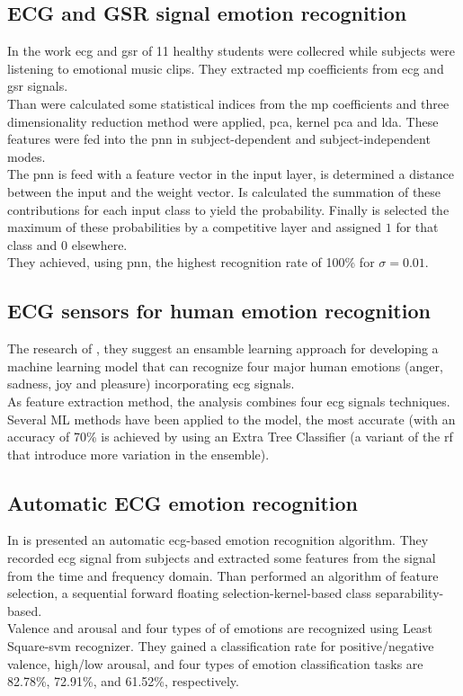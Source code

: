\subsection{ECG and GSR signal emotion recognition}
In the work \cite{goshvarpour2017accurate} \gls{ecg} and \gls{gsr} of 11 healthy students were collecred while subjects were listening to emotional music clips. They extracted \gls{mp} coefficients from \gls{ecg} and \gls{gsr} signals.
\\ \indent
Than were calculated some statistical indices from the \gls{mp} coefficients and three dimensionality reduction method were applied, \gls{pca}, kernel \gls{pca} and \gls{lda}. These features were fed into the \gls{pnn} in subject-dependent and subject-independent modes.
\\ \indent
The \gls{pnn} is feed with a feature vector in the input layer, is determined a distance between the input and the weight vector. Is calculated the summation of these contributions for each input class to yield the probability. Finally is selected the maximum of these probabilities by a competitive layer and assigned $1$ for that class and $0$ elsewhere.
\\ \indent
They achieved, using \gls{pnn}, the highest recognition rate of 100\% for $\sigma = 0.01$.

\subsection{ECG sensors for human emotion recognition}
The research of \cite{dissanayake2019ensemble}, they suggest an ensamble learning approach for developing a machine learning model that can recognize four major human emotions (anger, sadness, joy and pleasure) incorporating \gls{ecg} signals.
\\ \indent
As feature extraction method, the analysis combines four \gls{ecg} signals techniques. Several ML methods have been applied to the model, the most accurate (with an accuracy of 70\% is achieved by using an Extra Tree Classifier (a variant of the \gls{rf} that introduce more variation in the ensemble).

\subsection{Automatic ECG emotion recognition}
In \cite{hsu2017automatic} is presented an automatic \gls{ecg}-based emotion recognition algorithm. They recorded \gls{ecg} signal from subjects and extracted some features from the signal from the time and frequency domain. Than performed an algorithm of feature selection, a sequential forward floating selection-kernel-based class separability-based.
\\
Valence and arousal and four types of of emotions are recognized using Least Square-\gls{svm} recognizer. They gained a classification rate for positive/negative valence, high/low arousal, and four types of emotion classification tasks are 82.78\%, 72.91\%, and 61.52\%, respectively.

